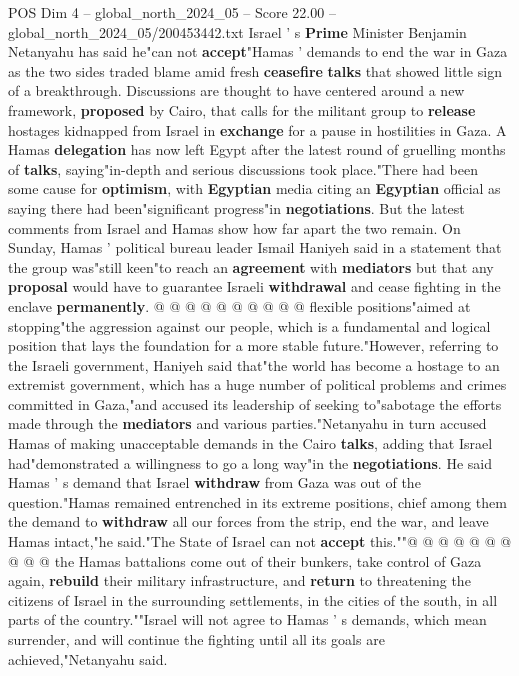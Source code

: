 \begin{textsample}{POS Dim 4 – global\_north\_2024\_05 – Score 22.00 – global\_north\_2024\_05/200453442.txt}  \label{ex:f4_pos_334}
Israel ' s \textbf{Prime} Minister Benjamin Netanyahu has said he"can not \textbf{accept}"Hamas ' demands to end the war in Gaza as the two sides traded blame amid fresh \textbf{ceasefire} \textbf{talks} that showed little sign of a breakthrough.
Discussions are thought to have centered around a new framework, \textbf{proposed} by Cairo, that calls for the militant group to \textbf{release} hostages kidnapped from Israel in \textbf{exchange} for a pause in hostilities in Gaza.
A Hamas \textbf{delegation} has now left Egypt after the latest round of gruelling months of \textbf{talks}, saying"in-depth and serious discussions took place."There had been some cause for \textbf{optimism}, with \textbf{Egyptian} media citing an \textbf{Egyptian} official as saying there had been"significant progress"in \textbf{negotiations}.
But the latest comments from Israel and Hamas show how far apart the two remain.
On Sunday, Hamas ' political bureau leader Ismail Haniyeh said in a statement that the group was"still keen"to reach an \textbf{agreement} with \textbf{mediators} but that any \textbf{proposal} would have to guarantee Israeli \textbf{withdrawal} and cease fighting in the enclave \textbf{permanently}. @ @ @ @ @ @ @ @ @ @ flexible positions"aimed at stopping"the aggression against our people, which is a fundamental and logical position that lays the foundation for a more stable future."However, referring to the Israeli government, Haniyeh said that"the world has become a hostage to an extremist government, which has a huge number of political problems and crimes committed in Gaza,"and accused its leadership of seeking to"sabotage the efforts made through the \textbf{mediators} and various parties."Netanyahu in turn accused Hamas of making unacceptable demands in the Cairo \textbf{talks}, adding that Israel had"demonstrated a willingness to go a long way"in the \textbf{negotiations}.
He said Hamas ' s demand that Israel \textbf{withdraw} from Gaza was out of the question."Hamas remained entrenched in its extreme positions, chief among them the demand to \textbf{withdraw} all our forces from the strip, end the war, and leave Hamas intact,"he said."The State of Israel can not \textbf{accept} this.""@ @ @ @ @ @ @ @ @ @ the Hamas battalions come out of their bunkers, take control of Gaza again, \textbf{rebuild} their military infrastructure, and \textbf{return} to threatening the citizens of Israel in the surrounding settlements, in the cities of the south, in all parts of the country.""Israel will not agree to Hamas ' s demands, which mean surrender, and will continue the fighting until all its goals are achieved,"Netanyahu said.

\end{textsample}
